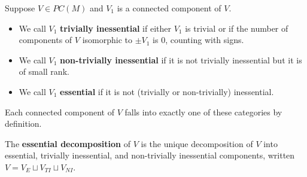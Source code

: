 \begin{comment}
	\begin{lemma}\label{L: one fixed}
		Let $f \colon V \to M$ and $f' \colon V' \to M$ be two representatives of the same class in $C^*_\Gamma(M)$ with decompositions $V = V_T \amalg V_Q$ and $V' = V'_T \amalg V'_Q$.
		Suppose $g \colon W \to M$ is another class with decomposition $W = W_T\amalg W_Q$ and that $W_T$ is transverse to $V_T$ and $V_T'$.
		Then $V_T \cap W_T = V_T' \cap W_T \in C^*_\Gamma(M)$.
	\end{lemma}
	\begin{proof}
		As $f$ and $f'$ represent the same element of $C^*_\Gamma(M)$, we have $f\amalg -f' \in Q(M)$.
		Furthermore, as $f|_{V_Q}$ and $f'|_{V'_Q}$ are in $Q(M)$ we have $f|_{V_T}-f'|_{V'_T} \in Q(M)$ by \cite[Lemma 12]{Lip14}.
		Thus by \red{SAME REF AS ABOVE}, $V_T \cap W_T -V'_T \cap W_T = (V_T -V'_T) \cap W_T \in Q(M)$.
		So $V_T \cap W_T = V'_T \cap W_T \in C^*_\Gamma(M)$.
	\end{proof}
	ECOMMENT

\end{comment}



\begin{definition}\label{D: essential}
	Suppose $V \in PC(M)$ and $V_1$ is a connected component of $V$.
	\begin{itemize}
		\item We call $V_1$ \textbf{trivially inessential} if either
		$V_1$ is trivial or if the number of components of
		$V$ isomorphic to $\pm V_1$ is $0$, counting with signs.

		\item We call ${V_1}$ \textbf{non-trivially inessential} if it is not trivially inessential but it is of small rank.

		\item We call ${V_1}$ \textbf{essential} if it is not (trivially or non-trivially) inessential.
	\end{itemize}

	Each connected component of $V$ falls into exactly one of these categories by definition.

	The \textbf{essential decomposition} of $V$ is the unique decomposition of $V$ into essential, trivially inessential, and non-trivially inessential components,
	written $V = V_E \sqcup V_{TI} \sqcup V_{NI}$.
\end{definition}

